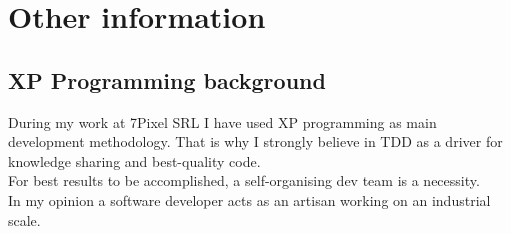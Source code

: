 \documentclass[letterpaper]{twentysecondcv} %
\begin{document}

\section{Other information}

\subsection{XP Programming background}

During my work at 7Pixel SRL I have used XP programming as main development methodology. That is why I strongly believe in TDD as a driver for knowledge sharing and best-quality code. \\
For best results to be accomplished, a self-organising dev team is a necessity. \\
In my opinion a software developer acts as an artisan working on an industrial scale.





\end{document}

